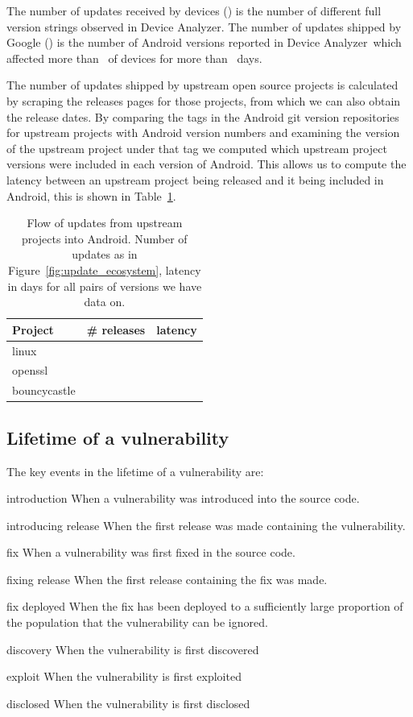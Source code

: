 \documentclass[conference,a4paper,twoside]{IEEEtran}
\let\OldTodo\todo
\renewcommand{\todo}{\OldTodo[inline]}
\newcommand{\da}{Device Analyzer}
\begin{document}
The number of updates received by devices (\daNumFullVersions) is the number of different full version strings observed in \da.
The number of updates shipped by Google (\daNumSigOSVersions) is the number of Android versions reported in \da\ which affected more than \daSigVersionPerc\ of devices for more than \daSigVersionDays\ days. \todo{this is the wrong number to be using}

The number of updates shipped by upstream open source projects is calculated by scraping the releases pages for those projects, from which we can also obtain the release dates.
By comparing the tags in the Android git version repositories for upstream projects with Android version numbers and examining the version of the upstream project under that tag we computed which upstream project versions were included in each version of Android.
This allows us to compute the latency between an upstream project being released and it being included in Android, this is shown in Table~\ref{tab:update_ecosystem}.
\begin{table}
\centering
\begin{tabular}{l|r|r}
Project	&	\# releases	&	latency \\ \hline
linux	&	\linuxNumVersions	&	\linuxMeanUpdateLatency \\
openssl	&	\opensslNumVersions	&	\opensslMeanUpdateLatency \\
bouncycastle	&	\bouncycastleNumVersions	&	\bouncycastleMeanUpdateLatency \\
\end{tabular}
\caption{Flow of updates from upstream projects into Android. Number of updates as in Figure~\ref{fig:update_ecosystem}, latency in days for all pairs of versions we have data on.}
\label{tab:update_ecosystem}
\end{table}

\subsection{Lifetime of a vulnerability}
The key events in the lifetime of a vulnerability are:

\begin{LaTeXdescription}
 \item[introduction] When a vulnerability was introduced into the source code.
 \item[introducing release] When the first release was made containing the vulnerability.
 \item[fix] When a vulnerability was first fixed in the source code.
 \item[fixing release] When the first release containing the fix was made.
 \item[fix deployed] When the fix has been deployed to a sufficiently large proportion of the population that the vulnerability can be ignored.
 \item[discovery] When the vulnerability is first discovered
 \item[exploit] When the vulnerability is first exploited
 \item[disclosed] When the vulnerability is first disclosed %
\end{LaTeXdescription}
\end{document}
